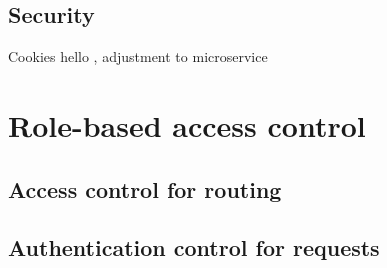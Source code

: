 \subsection{Security}
Cookies hello , adjustment to microservice 



\section{Role-based access control}

\subsection{Access control for routing}

\subsection{Authentication control for requests}


